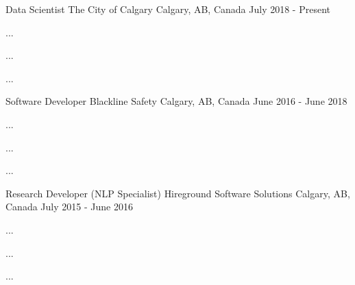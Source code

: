

\begin{cventries}

  \cventry
    {Data Scientist} %
    {The City of Calgary} %
    {Calgary, AB, Canada} %
    {July 2018 - Present} %
    {
      \begin{cvitems} %
        \item {...}
        \item {...}
        \item {...}
      \end{cvitems}
    }

  \cventry
    {Software Developer} %
    {Blackline Safety} %
    {Calgary, AB, Canada} %
    {June 2016 - June 2018} %
    {
      \begin{cvitems} %
        \item {...}
        \item {...}
        \item {...}
      \end{cvitems}
    }

  \cventry
    {Research Developer (NLP Specialist)} %
    {Hireground Software Solutions} %
    {Calgary, AB, Canada} %
    {July 2015 - June 2016} %
    {
      \begin{cvitems} %
        \item {...}
        \item {...}
        \item {...}
      \end{cvitems}
    }

\end{cventries}
